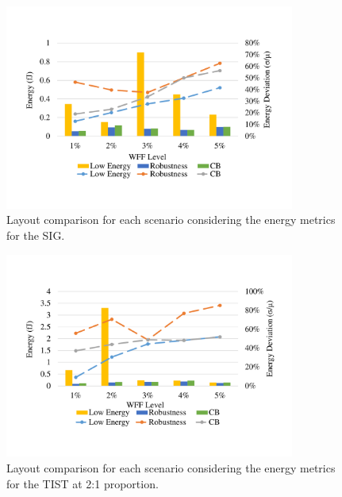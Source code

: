 \documentclass[pgmicro,diss,english]{iiufrgs}
\begin{document}
    \begin{figure}[]
        \centering
            \includegraphics[width=0.85\textwidth, trim={1.25cm 3cm 2cm 3cm}, clip]{comp3Lsig2Energy.pdf}
            \caption{Layout comparison for each scenario considering the energy metrics for the SIG.}
        \label{figscCompSIG}
    \end{figure}

    \begin{figure}[H]
        \centering
            \includegraphics[width=0.85\textwidth, trim={1.25cm 3cm 2cm 3cm}, clip]{comp3Ltist212Energy.pdf}
            \caption{Layout comparison for each scenario considering the energy metrics for the TIST at 2:1 proportion.}
        \label{figscCompTIST21}
    \end{figure}
\end{document}
